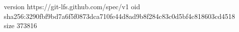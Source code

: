version https://git-lfs.github.com/spec/v1
oid sha256:3290fbf9bd7a6f5f0873dca710fe44d8ad9b8f284c83c0d5bf4c818603cd4518
size 373816

